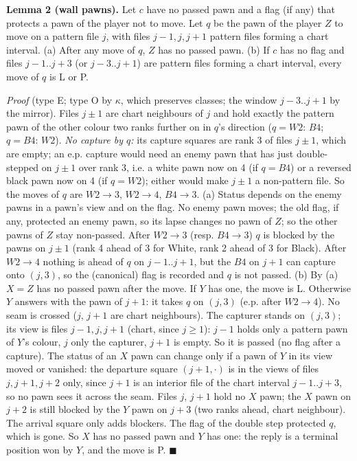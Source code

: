 \textbf{Lemma 2 (wall pawns).} Let $c$ have no passed pawn and a flag (if any) that protects a pawn of the player not to move. Let $q$ be the pawn of the player $Z$ to move on a pattern file $j$, with files $j-1,j,j+1$ pattern files forming a chart interval. (a) After any move of $q$, $Z$ has no passed pawn. (b) If $c$ has no flag and files $j-1..j+3$ (or $j-3..j+1$) are pattern files forming a chart interval, every move of $q$ is L or P.

\emph{Proof} (type E; type O by $\kappa$, which preserves classes; the window $j-3..j+1$ by the mirror). Files $j\pm1$ are chart neighbours of $j$ and hold exactly the pattern pawn of the other colour two ranks further on in $q$'s direction ($q=W2$: $B4$; $q=B4$: $W2$). \emph{No capture by $q$:} its capture squares are rank 3 of files $j\pm1$, which are empty; an e.p. capture would need an enemy pawn that has just double-stepped on $j\pm1$ over rank 3, i.e. a white pawn now on 4 (if $q=B4$) or a reversed black pawn now on 4 (if $q=W2$); either would make $j\pm1$ a non-pattern file. So the moves of $q$ are $W2\to3$, $W2\to4$, $B4\to3$. (a) Status depends on the enemy pawns in a pawn's view and on the flag. No enemy pawn moves; the old flag, if any, protected an enemy pawn, so its lapse changes no pawn of $Z$; so the other pawns of $Z$ stay non-passed. After $W2\to3$ (resp. $B4\to3$) $q$ is blocked by the pawns on $j\pm1$ (rank 4 ahead of 3 for White, rank 2 ahead of 3 for Black). After $W2\to4$ nothing is ahead of $q$ on $j-1..j+1$, but the $B4$ on $j+1$ can capture onto $(j,3)$, so the (canonical) flag is recorded and $q$ is not passed. (b) By (a) $X=Z$ has no passed pawn after the move. If $Y$ has one, the move is L. Otherwise $Y$ answers with the pawn of $j+1$: it takes $q$ on $(j,3)$ (e.p. after $W2\to4$). No seam is crossed ($j$, $j+1$ are chart neighbours). The capturer stands on $(j,3)$; its view is files $j-1,j,j+1$ (chart, since $j\ge1$): $j-1$ holds only a pattern pawn of $Y$'s colour, $j$ only the capturer, $j+1$ is empty. So it is passed (no flag after a capture). The status of an $X$ pawn can change only if a pawn of $Y$ in its view moved or vanished: the departure square $(j+1,\cdot)$ is in the views of files $j,j+1,j+2$ only, since $j+1$ is an interior file of the chart interval $j-1..j+3$, so no pawn sees it across the seam. Files $j$, $j+1$ hold no $X$ pawn; the $X$ pawn on $j+2$ is still blocked by the $Y$ pawn on $j+3$ (two ranks ahead, chart neighbour). The arrival square only adds blockers. The flag of the double step protected $q$, which is gone. So $X$ has no passed pawn and $Y$ has one: the reply is a terminal position won by $Y$, and the move is P. $\blacksquare$

